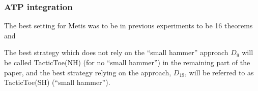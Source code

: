\documentclass[runningheads,a4paper,draft]{svjour3}
\def\metis{\textsf{Metis}\xspace}
\def\tactictoe{\textsf{TacticToe}\xspace}
\newcommand{\ra}[1]{\renewcommand{\arraystretch}{#1}}
\begin{document}
\subsubsection{ATP integration}


The best setting for \metis was to be in previous experiments to be 16
theorems and



The best strategy which does not rely on the ``small hammer'' approach $D_9$ 
will be called \tactictoe(NH) (for no ``small hammer'') in the remaining part 
of the paper, and the best strategy relying on the approach, $D_{19}$, will be 
referred to as \tactictoe(SH) (``small hammer'').
\end{document}
